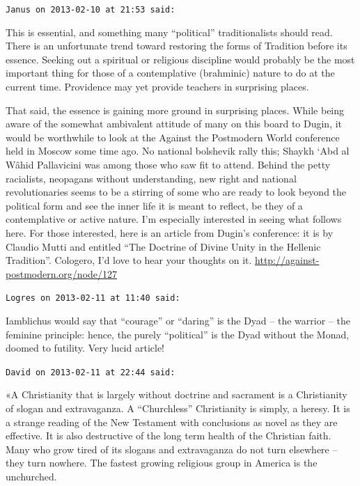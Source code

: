 \begin{footnotesize}
\begin{sffamily}
\texttt{Janus on 2013-02-10 at 21:53 said:}

This is essential, and something many ``political'' traditionalists should read. There is an unfortunate trend toward restoring the forms of Tradition before its essence. Seeking out a spiritual or religious discipline would probably be the most important thing for those of a contemplative (brahminic) nature to do at the current time. Providence may yet provide teachers in surprising places.

That said, the essence is gaining more ground in surprising places. While being aware of the somewhat ambivalent attitude of many on this board to Dugin, it would be worthwhile to look at the Against the Postmodern World conference held in Moscow some time ago. No national bolshevik rally this; Shaykh `Abd al Wâhid Pallavicini was among those who saw fit to attend. Behind the petty racialists, neopagans without understanding, new right and national revolutionaries seems to be a stirring of some who are ready to look beyond the political form and see the inner life it is meant to reflect, be they of a contemplative or active nature. I'm especially interested in seeing what follows here. For those interested, here is an article from Dugin's conference: it is by Claudio Mutti and entitled ``The Doctrine of Divine Unity in the Hellenic Tradition''. Cologero, I'd love to hear your thoughts on it.
\url{http://against-postmodern.org/node/127}


\hfill

\texttt{Logres on 2013-02-11 at 11:40 said:}

Iamblichus would say that ``courage'' or ``daring'' is the Dyad -- the warrior -- the feminine principle: hence, the purely ``political'' is the Dyad without the Monad, doomed to futility. Very lucid article!

\hfill

\texttt{David on 2013-02-11 at 22:44 said:}

«A Christianity that is largely without doctrine and sacrament is a Christianity of slogan and extravaganza. A ``Churchless'' Christianity is simply, a heresy. It is a strange reading of the New Testament with conclusions as novel as they are effective. It is also destructive of the long term health of the Christian faith. Many who grow tired of its slogans and extravaganza do not turn elsewhere -- they turn nowhere. The fastest growing religious group in America is the unchurched.


\end{sffamily}
\end{footnotesize}
